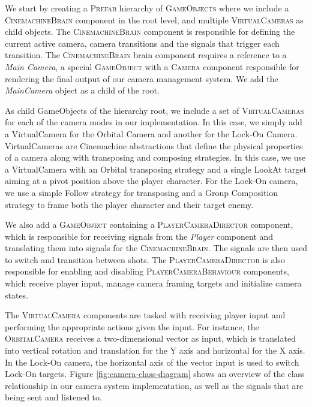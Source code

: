 We start by creating a \textsc{Prefab} hierarchy of \textsc{GameObjects} where we include a \textsc{CinemachineBrain} component in the root level, and multiple \textsc{VirtualCameras} as child objects. The \textsc{CinemachineBrain} component is responsible for defining the current active camera, camera transitions and the signals that trigger each transition. The \textsc{CinemachineBrain} brain component requires a reference to a \emph{Main Camera}, a special \textsc{GameObject} with a \textsc{Camera} component responsible for rendering the final output of our camera management system. We add the \emph{MainCamera} object as a child of the root.

As child GameObjects of the hierarchy root, we include a set of \textsc{VirtualCameras} for each of the camera modes in our implementation. In this case, we simply add a VirtualCamera for the Orbital Camera and another for the Lock-On Camera. VirtualCameras are Cinemachine abstractions that define the physical properties of a camera along with transposing and composing strategies. In this case, we use a VirtualCamera with an Orbital transposing strategy and a single LookAt target aiming at a pivot position above the player character. For the Lock-On camera, we use a simple Follow strategy for transposing and a Group Composition strategy to frame both the player character and their target enemy.

We also add a \textsc{GameObject} containing a \textsc{PlayerCameraDirector} component, which is responsible for receiving signals from the \emph{Player} component and translating them into signals for the \textsc{CinemachineBrain}. The signals are then used to switch and transition between shots. The \textsc{PlayerCameraDirector} is also responsible for enabling and disabling \textsc{PlayerCameraBehaviour} components, which receive player input, manage camera framing targets and initialize camera states.

The \textsc{VirtualCamera} components are tasked with receiving player input and performing the appropriate actions given the input. For instance, the \textsc{OrbitalCamera} receives a two-dimensional vector as input, which is translated into vertical rotation and translation for the Y axis and horizontal for the X axis. In the Lock-On camera, the horizontal axis of the vector input is used to switch Lock-On targets. Figure \ref{fig:camera-class-diagram} shows an overview of the class relationship in our camera system implementation, as well as the signals that are being sent and listened to.

